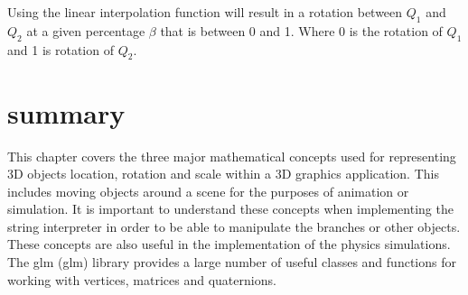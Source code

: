 \noindent
Using the linear interpolation function will result in a rotation between $Q_1$ and $Q_2$ at a given percentage $\beta$ that is between 0 and 1. Where 0 is the rotation of $Q_1$ and 1 is rotation of $Q_2$.

\section{summary}

This chapter covers the three major mathematical concepts used for representing 3D objects location, rotation and scale within a 3D graphics application. This includes moving objects around a scene for the purposes of animation or simulation. It is important to understand these concepts when implementing the string interpreter in order to be able to manipulate the branches or other objects. These concepts are also useful in the implementation of the physics simulations. The \acrlong{glm} (\acrshort{glm}) library provides a large number of useful classes and functions for working with vertices, matrices and quaternions.






